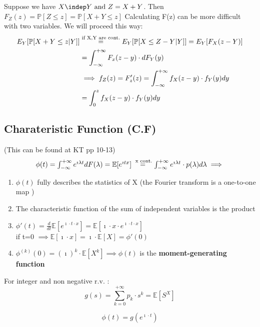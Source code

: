 Suppose we have $X \indep Y \text{ and } Z=X+Y$. Then $F_Z(z) = \mathbb{P}[Z\le z] = \mathbb{P}[X+Y \le z]$
Calculating F(z) can be more difficult with two variables. We will proceed this way:
\\
\begin{equation}
  $$
  \begin{split}
    E_{Y}[\mathbb{P}[X+Y \le z | Y]]  &\stackrel{\text{if X,Y are cont.}}{=} E_Y [\mathbb{P}[X \le Z - Y | Y]] = E_Y[F_X(z-Y)]\\
    &=\int_{-\infty}^{+\infty}F_x(z-y) \cdot dF_Y(y) \\
    &\implies f_Z(z) = F'_z(z) = \int_{-\infty}^{+\infty}{f_X(z-y)\cdot f_Y(y) dy} \\
    &=\int_{0}^{z}{f_X(z-y) \cdot f_Y(y) dy}
  \end{split}
  $$
\end{equation}


\subsection{Charateristic Function (C.F)}
(This can be found at KT pp 10-13)
\begin{equation}
  $$\phi(t) = \int_{-\infty}^{+\infty}e^{\imath \lambda t} dF(\lambda) = \mathbb{E}[e^{\imath t x}]\stackrel{\text{ x cont.}}{=}
  \int_{-\infty}^{+\infty}e^{\imath \lambda t} \cdot p(\lambda) d\lambda
  \\ \implies$$
\end{equation}
\begin{enumerate}
  \item $\phi(t)$ fully describes the statistics of X (the Fourier transform is a  one-to-one map )
  \item The characteristic function of the sum of independent variables is the product
  \item $\phi'(t)=\frac{d}{dt} \mathbb{E}[e^{\imath \cdot t \cdot x}]=\mathbb{E}[\imath \cdot x \cdot e^{\imath \cdot t \cdot x}]$ \\
  if t=0 $\implies \mathbb{E}[\imath \cdot x]=\imath \cdot \mathbb{E}[ X] = \phi'(0)$
  \item $\phi^{(k)}(0) = (\imath)^k \cdot \mathbb{E}[X^k] \implies \phi(t)$ is the \textbf{moment-generating function}
\end{enumerate}


For integer and non negative r.v. :
$$g(s)=\sum\limits_{k=0}^{+\infty}p_k \cdot s^k = \mathbb{E}[S^X]$$

$$\phi(t) = g(e^{\imath \cdot t})$$

